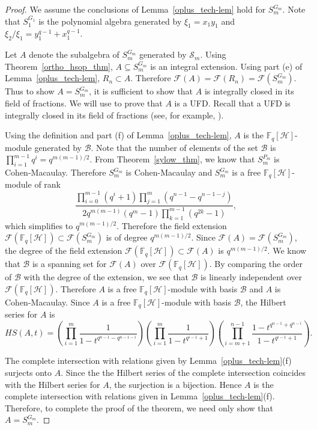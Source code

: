 \documentclass{amsart}
\newcommand{\field}{\mathbb{F}}
\newcommand{\cS}{\mathcal{S}}
\newcommand{\F}{\mathcal{F}}
\newcommand{\HH}{\mathcal{H}}
\newcommand{\B}{\mathcal{B}}
\begin{document}
\begin{proof} %
We assume the conclusions of Lemma~\ref{oplus_tech-lem} hold for $S_m^{G_m}$.
Note that $S_1^{G_1}$ is the polynomial algebra generated by $\xi_1=x_1y_1$
and $\xi_2/\xi_1=y_1^{q-1}+x_1^{q-1}$.

    Let $A$ denote the subalgebra  of $S_m^{G_m}$ generated by $\cS_m$. 
    Using Theorem~\ref{ortho_hsop_thm},
$A\subseteq S_m^{G_m}$ is an integral extension.
Using part (e) of Lemma~\ref{oplus_tech-lem}, $R_{n}\subset A$. Therefore 
$\F(A)=\F(R_{n})=\F(S_m^{G_m})$.
Thus to show $A=S_m^{G_m}$, it is sufficient to show that $A$ is integrally closed in its field of fractions.
We will use \cite[Proposition 1.1]{Kropholler+Rajaei+Segal:05} to prove that $A$ is a UFD. 
Recall that a UFD is integrally closed in its field of fractions (see, for example, \cite[Proposition 4.10]{eisenbud:95}).

Using the definition and part (f) of Lemma~\ref{oplus_tech-lem}, $A$ is the $\field_q[\HH]$-module generated by $\B$.
Note that the number of elements of the set $\B$ is $\prod_{i=1}^{m-1}q^i=q^{m(m-1)/2}$.
From Theorem~\ref{sylow_thm}, we know that $S_m^{P_m}$ is Cohen-Macaulay.
Therefore $S_m^{G_m}$ is Cohen-Macaulay
and $S_m^{G_m}$ is a free $\field_q[\HH]$-module of rank
    $$
        \frac{\prod_{i=0}^{m-1}(q^i+1)\prod_{j=1}^m(q^{n-1}-q^{n-1-j})}{2q^{m(m-1)}(q^m-1)\prod_{k=1}^{m-1}(q^{2k}-1)},
    $$
which simplifies to $q^{m(m-1)/2}$. 
Therefore  the field extension $\F(\field_q[\HH])\subset \F(S_m^{G_m})$ is of degree $q^{m(m-1)/2}$. 
Since $\F(A)=\F(S_m^{G_m})$, the degree of the field extension $\F(\field_q[\HH])\subset \F(A)$ is $q^{m(m-1)/2}$.
We know that $\B$ is a spanning set for $\F(A)$ over $\F(\field_q[\HH])$. By comparing the order of $\B$ with the degree of the extension, 
we see that $\B$ is linearly independent over  $\F(\field_q[\HH])$. Therefore $A$ is a free $\field_q[\HH]$-module with basis $\B$ and $A$ is Cohen-Macaulay. 
Since $A$ is a free $\field_q[\HH]$-module with basis $\B$, the Hilbert series for $A$ is
$$HS(A,t)=\left(\prod_{i=1}^m\frac{1}{1-t^{q^{n-1}-q^{n-1-i}}}\right)
\left(\prod_{i=1}^{m}\frac{1}{1-t^{q^{i-1}+1}}\right)
\left(\prod_{i=m+1}^{n-1}\frac{1-t^{q^{n-1}+q^{n-i}}}{1-t^{q^{i-1}+1}}\right).$$

The complete intersection with relations given by 
Lemma~\ref{oplus_tech-lem}(f) surjects onto $A$.
Since the the Hilbert series of the complete intersection coincides with the Hilbert series for $A$, the surjection is a bijection.
Hence $A$ is the complete intersection with relations given in Lemma~\ref{oplus_tech-lem}(f). Therefore, to complete the proof of the theorem, 
we need only show that $A=S_m^{G_m}$.


\end{proof}
\end{document}
